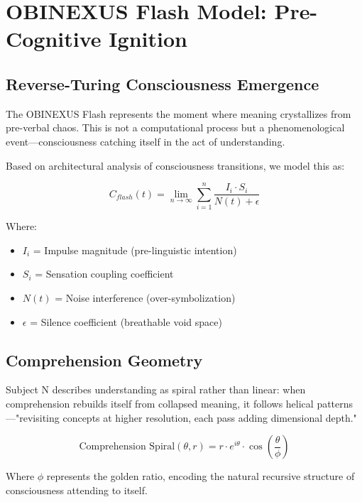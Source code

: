 \documentclass[12pt]{article}
\begin{document}
\section{OBINEXUS Flash Model: Pre-Cognitive Ignition}

\subsection{Reverse-Turing Consciousness Emergence}

The OBINEXUS Flash represents the moment where meaning crystallizes from pre-verbal chaos. This is not a computational process but a phenomenological event—consciousness catching itself in the act of understanding.

Based on architectural analysis of consciousness transitions, we model this as:

\begin{equation}
C_{flash}(t) = \lim_{n \to \infty} \sum_{i=1}^{n} \frac{I_i \cdot S_i}{N(t) + \epsilon}
\end{equation}

Where:
\begin{itemize}
    \item $I_i$ = Impulse magnitude (pre-linguistic intention)
    \item $S_i$ = Sensation coupling coefficient  
    \item $N(t)$ = Noise interference (over-symbolization)
    \item $\epsilon$ = Silence coefficient (breathable void space)
\end{itemize}

\subsection{Comprehension Geometry}

Subject N describes understanding as spiral rather than linear: when comprehension rebuilds itself from collapsed meaning, it follows helical patterns—"revisiting concepts at higher resolution, each pass adding dimensional depth."

\begin{equation}
\text{Comprehension Spiral}(\theta, r) = r \cdot e^{i\theta} \cdot \cos\left(\frac{\theta}{\phi}\right)
\end{equation}

Where $\phi$ represents the golden ratio, encoding the natural recursive structure of consciousness attending to itself.
\end{document}
